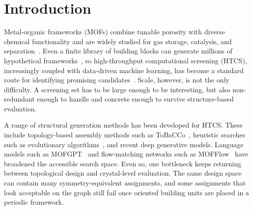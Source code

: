 \documentclass[pdflatex,sn-mathphys-num]{sn-jnl}
\theoremstyle{thmstyleone}%
\begin{document}
\section*{Introduction}
\label{sec:intro}
Metal-organic frameworks (MOFs) combine tunable porosity with diverse chemical functionality and are widely studied for gas storage, catalysis, and separation~\cite{zhou2012introduction,furukawa2013chemistry}. Even a finite library of building blocks can generate millions of hypothetical frameworks~\cite{wilmer2012large}, so high-throughput computational screening (HTCS), increasingly coupled with data-driven machine learning, has become a standard route for identifying promising candidates~\cite{colon2014high, park2024data, kim2025machine}. Scale, however, is not the only difficulty. A screening set has to be large enough to be interesting, but also non-redundant enough to handle and concrete enough to survive structure-based evaluation.

A range of structural generation methods has been developed for HTCS. These include topology-based assembly methods such as ToBaCCo~\cite{colon2017topologically}, heuristic searches such as evolutionary algorithms~\cite{jin2025intelligent}, and recent deep generative models. Language models such as MOFGPT~\cite{badrinarayanan2025mofgpt} and flow-matching networks such as MOFFlow~\cite{Kim2024MOFFlowFM} have broadened the accessible search space. Even so, one bottleneck keeps returning between topological design and crystal-level evaluation. The same design space can contain many symmetry-equivalent assignments, and some assignments that look acceptable on the graph still fail once oriented building units are placed in a periodic framework.
\end{document}
